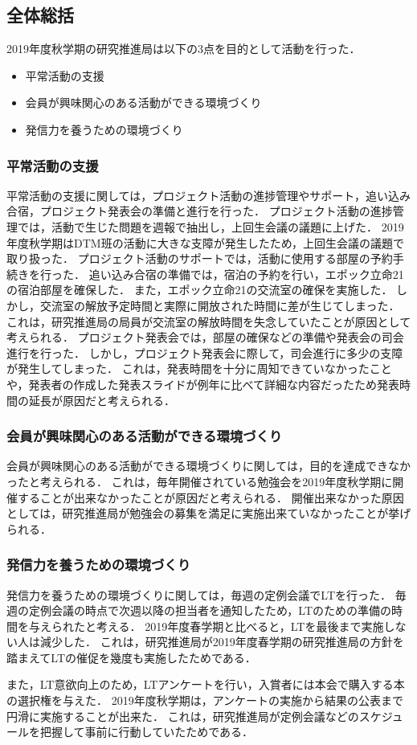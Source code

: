 \subsection*{全体総括}

2019年度秋学期の研究推進局は以下の3点を目的として活動を行った．
\begin{itemize}
\item 平常活動の支援
\item 会員が興味関心のある活動ができる環境づくり
\item 発信力を養うための環境づくり
\end{itemize}

\subsubsection*{平常活動の支援}
平常活動の支援に関しては，プロジェクト活動の進捗管理やサポート，追い込み合宿，プロジェクト発表会の準備と進行を行った．
プロジェクト活動の進捗管理では，活動で生じた問題を週報で抽出し，上回生会議の議題に上げた．
2019年度秋学期はDTM班の活動に大きな支障が発生したため，上回生会議の議題で取り扱った．
プロジェクト活動のサポートでは，活動に使用する部屋の予約手続きを行った．
追い込み合宿の準備では，宿泊の予約を行い，エポック立命21の宿泊部屋を確保した．
また，エポック立命21の交流室の確保を実施した．
しかし，交流室の解放予定時間と実際に開放された時間に差が生じてしまった．
これは，研究推進局の局員が交流室の解放時間を失念していたことが原因として考えられる．
プロジェクト発表会では，部屋の確保などの準備や発表会の司会進行を行った．
しかし，プロジェクト発表会に際して，司会進行に多少の支障が発生してしまった．
これは，発表時間を十分に周知できていなかったことや，発表者の作成した発表スライドが例年に比べて詳細な内容だったため発表時間の延長が原因だと考えられる．

\subsubsection*{会員が興味関心のある活動ができる環境づくり} 
会員が興味関心のある活動ができる環境づくりに関しては，目的を達成できなかったと考えられる．
これは，毎年開催されている勉強会を2019年度秋学期に開催することが出来なかったことが原因だと考えられる．
開催出来なかった原因としては，研究推進局が勉強会の募集を満足に実施出来ていなかったことが挙げられる．

\subsubsection*{発信力を養うための環境づくり} 
発信力を養うための環境づくりに関しては，毎週の定例会議でLTを行った．
毎週の定例会議の時点で次週以降の担当者を通知したため，LTのための準備の時間を与えられたと考える．
2019年度春学期と比べると，LTを最後まで実施しない人は減少した．
これは，研究推進局が2019年度春学期の研究推進局の方針を踏まえてLTの催促を幾度も実施したためである．

また，LT意欲向上のため，LTアンケートを行い，入賞者には本会で購入する本の選択権を与えた．
2019年度秋学期は，アンケートの実施から結果の公表まで円滑に実施することが出来た．
これは，研究推進局が定例会議などのスケジュールを把握して事前に行動していたためである．
